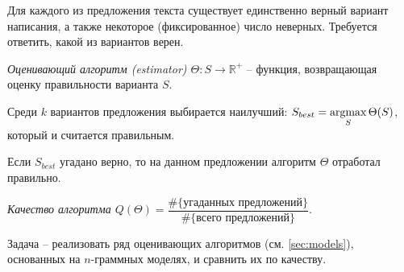 Для каждого из предложения текста существует единственно верный вариант написания, а также некоторое (фиксированное) число неверных. Требуется ответить, какой из вариантов верен.

\begin{definition}
	{\textit{Оценивающий алгоритм (estimator) $\Theta : S \rightarrow \mathbb{R}^+ $}} -- функция, возвращающая оценку правильности варианта $S$.
\end{definition}

Среди $k$ вариантов предложения выбирается наилучший: $S_{best} = \operatorname*{argmax}\limits_{S} \Theta(S)$, который и считается правильным.

Если $S_{best}$ угадано верно, то на данном предложении алгоритм $\Theta$ отработал правильно.

\begin{definition}
	{\textit{Качество алгоритма $Q(\Theta) = \dfrac{\#\{ \text{угаданных предложений} \}}{\#\{ \text{всего предложений} \}}$}}.
\end{definition}

Задача -- реализовать ряд оценивающих алгоритмов (см. \cref{sec:models}), основанных на $n$-граммных моделях, и сравнить их по качеству.